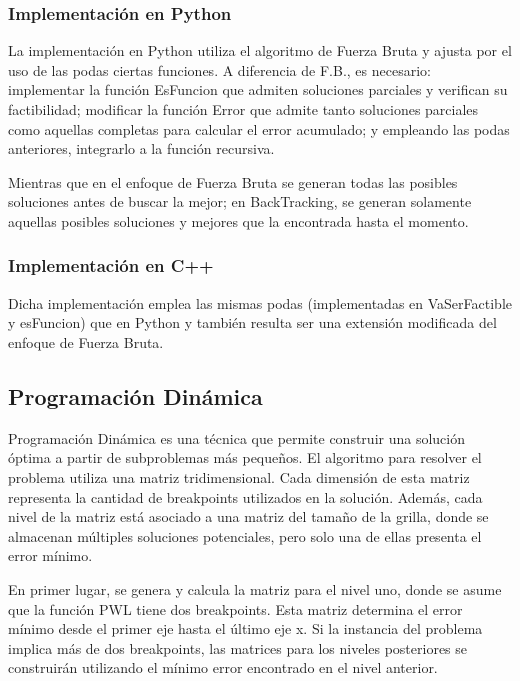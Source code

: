 \documentclass{article}
\begin{document}
   	
        \subsubsection{Implementación en Python}
        
        La implementación en Python utiliza el algoritmo de Fuerza Bruta y ajusta por el uso de las podas ciertas funciones. A diferencia de F.B., es necesario: implementar la función EsFuncion que admiten soluciones parciales y verifican su factibilidad; modificar la función Error que admite tanto soluciones parciales como aquellas completas para calcular el error acumulado; y empleando las podas anteriores, integrarlo a la función recursiva.
        
        
       
        Mientras que en el enfoque de Fuerza Bruta se generan todas las posibles soluciones antes de buscar la mejor; en BackTracking, se generan solamente aquellas posibles soluciones y mejores que la encontrada hasta el momento.  
        
         
        \subsubsection{Implementación en C++}
       Dicha implementación emplea las mismas podas (implementadas en VaSerFactible y esFuncion) que en Python y también resulta ser una extensión modificada del enfoque de Fuerza Bruta. 
       
    

        \subsection{Programación  Dinámica}
        
        Programación Dinámica es una técnica que permite construir una solución óptima a partir de subproblemas más pequeños. El algoritmo para resolver el problema utiliza una matriz tridimensional. Cada dimensión de esta matriz representa la cantidad de breakpoints utilizados en la solución. Además, cada nivel de la matriz está asociado a una matriz del tamaño de la grilla, donde se almacenan múltiples soluciones potenciales, pero solo una de ellas presenta el error mínimo.
        

        
        En primer lugar, se genera y calcula la matriz para el nivel uno, donde se asume que la función PWL tiene dos breakpoints. Esta matriz determina el error mínimo desde el primer eje hasta el último eje x. Si la instancia del problema implica más de dos breakpoints, las matrices para los niveles posteriores se construirán utilizando el mínimo error encontrado en el nivel anterior.
        
\end{document}
